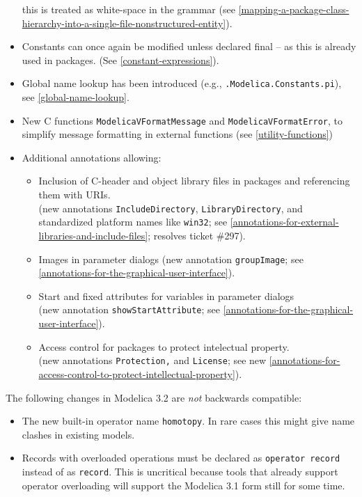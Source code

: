 \begin{itemize}
  this is treated as white-space in the grammar (see \cref{mapping-a-package-class-hierarchy-into-a-single-file-nonstructured-entity}).
\item
  Constants can once again be modified unless declared final -- as this is already used in packages.  (See \cref{constant-expressions}).
\item
  Global name lookup has been introduced (e.g.,
  \lstinline!.Modelica.Constants.pi!), see \cref{global-name-lookup}.
\item
  New C functions \lstinline!ModelicaVFormatMessage! and \lstinline!ModelicaVFormatError!, to
  simplify message formatting in external functions (see \cref{utility-functions})
\item
  Additional annotations allowing:
  \begin{itemize}
  \item
    Inclusion of C-header and object library files in packages and
    referencing them with URIs.\\
    (new annotations \lstinline!IncludeDirectory!, \lstinline!LibraryDirectory!, and
    standardized platform names like \lstinline!win32!; see \cref{annotations-for-external-libraries-and-include-files}; resolves
    ticket \#297).
  \item
    Images in parameter dialogs (new annotation \lstinline!groupImage!; see
    \cref{annotations-for-the-graphical-user-interface}).
  \item
    Start and fixed attributes for variables in parameter dialogs\\
    (new annotation \lstinline!showStartAttribute!; see \cref{annotations-for-the-graphical-user-interface}).
  \item
    Access control for packages to protect intelectual property.\\
    (new annotations \lstinline!Protection,! and \lstinline!License!; see new \cref{annotations-for-access-control-to-protect-intellectual-property}).
  \end{itemize}
\end{itemize}

The following changes in Modelica 3.2 are \emph{not} backwards compatible:
\begin{itemize}
\item
  The new built-in operator name \lstinline!homotopy!. In rare cases this might
  give name clashes in existing models.
\item
  Records with overloaded operations must be declared as \lstinline!operator record! instead of as \lstinline!record!. This is uncritical because tools
  that already support operator overloading will support the Modelica
  3.1 form still for some time.
\end{itemize}


